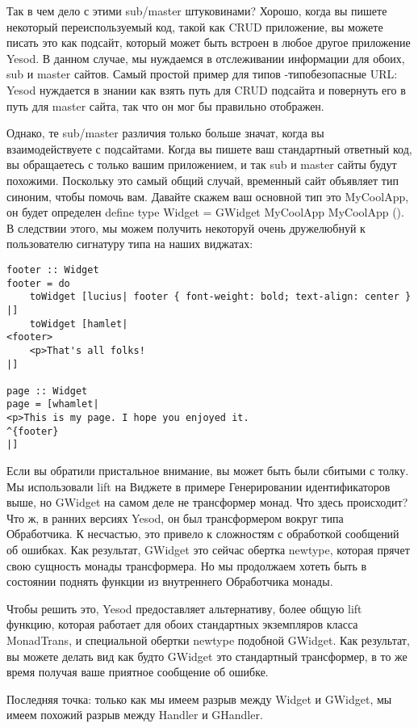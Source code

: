 Так в чем дело с этими sub/master штуковинами? Хорошо, когда вы пишете некоторый переиспользуемый код, такой как CRUD приложение, вы можете писать это как подсайт, который может быть встроен в любое другое приложение Yesod. В данном случае, мы нуждаемся в отслеживании информации для обоих, sub и master сайтов. Самый простой пример для типов -типобезопасные URL: Yesod нуждается в знании как взять путь для CRUD подсайта и повернуть его в путь для master сайта, так что он мог бы правильно отображен.

Однако, те sub/master различия только больше значат, когда вы взаимодействуете с подсайтами. Когда вы пишете ваш стандартный ответный код, вы обращаетесь с только вашим приложением, и так sub и master сайты будут похожими. Поскольку это самый общий случай, временный сайт объявляет тип синоним, чтобы помочь вам. Давайте скажем ваш основной тип это MyCoolApp, он будет определен define type Widget = GWidget MyCoolApp MyCoolApp (). В следствии этого, мы можем получить некоторуй очень дружелюбнуй к пользователю сигнатуру типа на наших виджатах:

\begin{lstlisting}
footer :: Widget
footer = do
    toWidget [lucius| footer { font-weight: bold; text-align: center } |]
    toWidget [hamlet|
<footer>
    <p>That's all folks!
|]

page :: Widget
page = [whamlet|
<p>This is my page. I hope you enjoyed it.
^{footer}
|]
\end{lstlisting}

Если вы обратили пристальное внимание, вы может быть были сбитыми с толку. Мы использовали lift на Виджете в примере Генерировании идентификаторов выше, но GWidget на самом деле не трансформер монад. Что здесь происходит? Что ж, в ранних версиях Yesod, он был трансформером вокруг типа Обработчика. К несчастью, это привело к сложностям с обработкой сообщений об ошибках. Как результат, GWidget это сейчас обертка newtype, которая прячет свою сущность монады трансформера. Но мы продолжаем хотеть быть в состоянии поднять функции из внутреннего Обработчика монады.

Чтобы решить это, Yesod предоставляет альтернативу, более общую lift функцию, которая работает для обоих стандартных экземпляров класса MonadTrans, и специальной обертки newtype подобной GWidget. Как результат, вы можете делать вид как будто GWidget это стандартный трансформер, в то же время получая ваше приятное сообщение об ошибке.

Последняя точка: только как мы имеем разрыв между Widget и GWidget, мы имеем похожий разрыв между Handler и GHandler.

